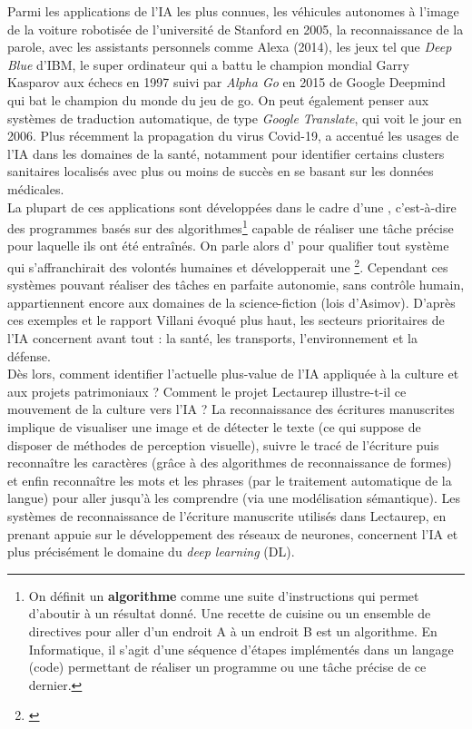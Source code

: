 Parmi les applications de l'IA les plus connues, les véhicules autonomes à l'image de la voiture robotisée de l'université de Stanford en 2005, la reconnaissance de la parole, avec les assistants personnels comme Alexa (2014), les jeux tel que \textit{Deep Blue} d'IBM, le super ordinateur qui a battu le champion mondial Garry Kasparov aux échecs en 1997 suivi par \textit{Alpha Go} en 2015 de Google Deepmind qui bat le champion du monde du jeu de go. On peut également penser aux systèmes de traduction automatique, de type \textit{Google Translate}, qui voit le jour en 2006. Plus récemment la propagation du virus Covid-19, a accentué les usages de l'IA dans les domaines de la santé, notamment pour identifier certains clusters sanitaires localisés avec plus ou moins de succès en se basant sur les données médicales. \\

La plupart de ces applications sont développées dans le cadre d'une , c'est-à-dire des programmes basés sur des algorithmes\footnote{On définit un \textbf{algorithme} comme une suite d'instructions qui permet d'aboutir à un résultat donné. Une recette de cuisine ou un ensemble de directives pour aller d'un endroit A à un endroit B est un algorithme. En Informatique, il s'agit d'une séquence d'étapes implémentés dans un langage (code) permettant de réaliser un programme ou une tâche précise de ce dernier.} capable de réaliser une tâche précise pour laquelle ils ont été entraînés. On parle alors d' pour qualifier tout système qui s'affranchirait des volontés humaines et développerait une \footnote{\cite{ganascia_mythe_2017}}. Cependant ces systèmes pouvant réaliser des tâches en parfaite autonomie, sans contrôle humain, appartiennent encore aux domaines de la science-fiction (lois d'Asimov). D'après ces exemples et le rapport Villani évoqué plus haut, les secteurs prioritaires de l'IA concernent avant tout : la santé, les transports, l'environnement et la défense. \\

Dès lors, comment identifier l'actuelle plus-value de l'IA appliquée à la culture et aux projets patrimoniaux ? Comment le projet Lectaurep illustre-t-il ce mouvement de la culture vers l'IA ? 
La reconnaissance des écritures manuscrites implique de visualiser une image et de détecter le texte (ce qui suppose de disposer de méthodes de perception visuelle), suivre le tracé de l'écriture puis reconnaître les caractères (grâce à des algorithmes de reconnaissance de formes) et enfin reconnaître les mots et les phrases (par le traitement automatique de la langue) pour aller jusqu'à les comprendre (via une modélisation sémantique). Les systèmes de reconnaissance de l'écriture manuscrite utilisés dans Lectaurep, en prenant appuie sur le développement des réseaux de neurones, concernent l'IA et plus précisément le domaine du \textit{deep learning} (DL).\\

